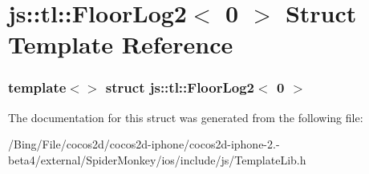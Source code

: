 \hypertarget{structjs_1_1tl_1_1_floor_log2_3_010_01_4}{\section{js\-:\-:tl\-:\-:Floor\-Log2$<$ 0 $>$ Struct Template Reference}
\label{structjs_1_1tl_1_1_floor_log2_3_010_01_4}
}
\subsubsection*{template$<$$>$ struct js\-::tl\-::\-Floor\-Log2$<$ 0 $>$}



The documentation for this struct was generated from the following file\-:\begin{DoxyCompactItemize}
\item 
/\-Bing/\-File/cocos2d/cocos2d-\/iphone/cocos2d-\/iphone-\/2.-\/beta4/external/\-Spider\-Monkey/ios/include/js/Template\-Lib.\-h\end{DoxyCompactItemize}
